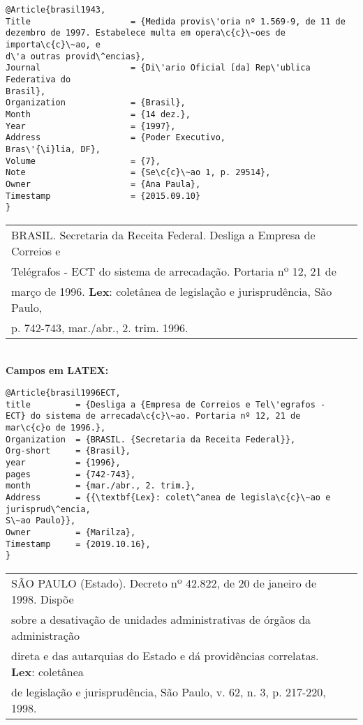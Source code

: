 \begin{verbatim}
@Article{brasil1943,
Title                    = {Medida provis\'oria nº 1.569-9, de 11 de 
dezembro de 1997. Estabelece multa em opera\c{c}\~oes de importa\c{c}\~ao, e 
d\'a outras provid\^encias},
Journal                  = {Di\'ario Oficial [da] Rep\'ublica Federativa do 
Brasil},
Organization             = {Brasil},
Month                    = {14 dez.},
Year                     = {1997},
Address                  = {Poder Executivo,
Bras\'{\i}lia, DF},
Volume                   = {7},
Note                     = {Se\c{c}\~ao 1, p. 29514},
Owner                    = {Ana Paula},
Timestamp                = {2015.09.10}
}
\end{verbatim}


\begin{tabular}{|l|c|} \hline
	BRASIL. Secretaria da Receita Federal. Desliga a Empresa de Correios e \\ Tel\'egrafos - ECT do sistema de arrecada\c{c}\~ao. Portaria nº 12, 21 de \\ mar\c{c}o de 1996. \textbf{Lex}: colet\^anea de legisla\c{c}\~ao e jurisprud\^encia, S\~ao Paulo,\\ p. 742-743,
	mar./abr., 2. trim. 1996. 
	\\\hline
\end{tabular} \\

\textbf{Campos em LATEX:} 


\begin{verbatim}
@Article{brasil1996ECT,
title         = {Desliga a {Empresa de Correios e Tel\'egrafos - 
ECT} do sistema de arrecada\c{c}\~ao. Portaria nº 12, 21 de
mar\c{c}o de 1996.},
Organization  = {BRASIL. {Secretaria da Receita Federal}},
Org-short     = {Brasil},
year          = {1996},
pages         = {742-743},
month         = {mar./abr., 2. trim.},
Address       = {{\textbf{Lex}: colet\^anea de legisla\c{c}\~ao e jurisprud\^encia, 
S\~ao Paulo}},
Owner         = {Marilza},
Timestamp     = {2019.10.16}, 
}
\end{verbatim}


\begin{tabular}{|l|c|} \hline
	S\~AO PAULO (Estado). Decreto nº 42.822, de 20 de janeiro de 1998. Disp\~oe \\ sobre a desativa\c{c}\~ao de unidades administrativas de \'org\~aos da administra\c{c}\~ao \\
	direta e das autarquias do Estado e d\'a provid\^encias correlatas. \textbf{Lex}: colet\^anea \\ de legisla\c{c}\~ao e jurisprud\^encia, S\~ao Paulo, v. 62, n. 3, p. 217-220,
	1998.
	\\\hline
\end{tabular} \\

